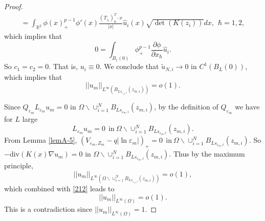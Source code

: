 \documentclass[10pt,a4paper]{amsart}
\begin{document}
\begin{proof}
\begin{equation*}
\begin{split}
=\int_{\mathbb{R}^2}\phi(x)^{p-1}_+\phi'(x)\frac{(T_{z_{i}})_\hbar^T\cdot x}{|x|}\hat{u}_{i}(x)\sqrt{\det(K(z_i))}dx,\ \  \hbar=1,2,
\end{split}
\end{equation*}
which implies that
\begin{equation}\label{211}
0=\int_{B_1(0)}\phi^{p-1}_+\frac{\partial \phi}{\partial x_\hbar}\hat{u}_i.
\end{equation}
So $ c_1=c_2=0. $ That is, $ u_i\equiv 0. $ We conclude that $ \tilde{u}_{N,i}\to 0 $ in  $ C^1(B_L(0)) $, which implies that
\begin{equation}\label{212}
||u_m||_{L^\infty(B_{Ls_{\varepsilon_m,i}}(z_{m,i}))}=o(1).
\end{equation}

Since $ Q_{\varepsilon_m} L_{\varepsilon_m} u_m = 0 $ in $ \Omega \backslash\cup_{i=1}^NB_{Ls_{\varepsilon_m,i}}(z_{m,i}) $, by the definition of $  Q_{\varepsilon_m} $ we have for $ L $ large
\begin{equation*}
 L_{\varepsilon_m} u_m = 0\  \ \text{in} \ \Omega \backslash\cup_{i=1}^NB_{Ls_{\varepsilon_m,i}}(z_{m,i}).
\end{equation*}
From Lemma \ref{lemA-5},  $ (V_{\varepsilon_m,Z_m}-q|\ln\varepsilon_m|)_+=0\  \ \text{in} \ \Omega \backslash\cup_{i=1}^NB_{Ls_{\varepsilon_m,i}}(z_{m,i}). $
So $ -\text{div}(K(x)\nabla u_m)=0 $ in $ \Omega \backslash\cup_{i=1}^NB_{Ls_{\varepsilon_m,i}}(z_{m,i}). $
Thus by the maximum principle, 
\begin{equation*}
||u_m||_{L^\infty(\Omega\backslash \cup_{i=1}^NB_{Ls_{\varepsilon_m,i}}(z_{m,i}))}=o(1),
\end{equation*}
which combined with \eqref{212} leads to
\begin{equation*}
||u_m||_{L^\infty(\Omega)}=o(1).
\end{equation*}
This is a contradiction since $ ||u_m||_{L^\infty(\Omega)}=1. $



\end{proof}
\end{document}
